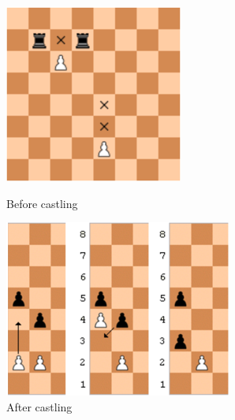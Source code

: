 \documentclass{article}
\begin{document}
\begin{figure}[!htb]
%
    \includegraphics[width=\linewidth]{chess7}
    \caption{Before castling}\label{fig:chess7}
\endminipage\hfill
{}%
    \includegraphics[width=\linewidth]{chess10}
    \caption{After castling}\label{fig:chess8}
\endminipage
\end{figure}
\end{document}
